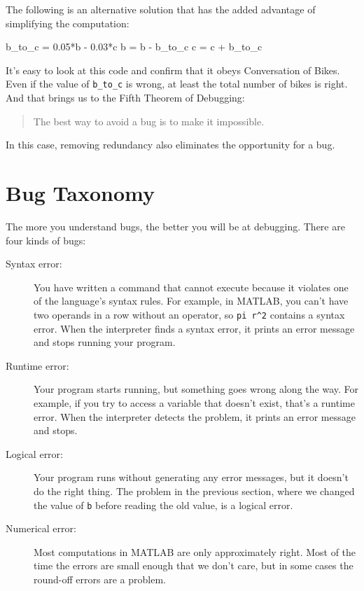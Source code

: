 
The following is an alternative solution that
has the added advantage of simplifying the computation:

\begin{code}
b_to_c = 0.05*b - 0.03*c
b = b - b_to_c
c = c + b_to_c
\end{code}

It's easy to look at this code and confirm that it obeys Conversation
of Bikes.  Even if the value of \verb"b_to_c" is wrong, at least the total
number of bikes is right.  And that brings us to the Fifth Theorem of
Debugging:

\begin{quote}
The best way to avoid a bug is to make it impossible.
\end{quote}


In this case, removing redundancy also eliminates the opportunity for a bug.

\section{Bug Taxonomy}

The more you understand bugs, the better you will be at debugging.
There are four kinds of bugs:


\begin{description}

\item[Syntax error:] You have written a command that cannot
execute because it violates one of the language's syntax rules.  For example, in MATLAB,
you can't have two operands in a row without an operator, so
\verb+pi r^2+ contains a syntax error.  When the interpreter finds a syntax
error, it prints an error message and stops running your program.

\item[Runtime error:] Your program starts running, but something goes
wrong along the way.  For example, if you try to access a variable
that doesn't exist, that's a runtime error.  When the interpreter detects the
problem, it prints an error message and stops.

\item[Logical error:] Your program runs without generating any error
messages, but it doesn't do the right thing.  The problem in the
previous section, where we changed the value of {\tt b} before
reading the old value, is a logical error.

\item[Numerical error:] Most computations in MATLAB are only
approximately right.  Most of the time the errors are small enough
that we don't care, but in some cases the round-off errors are a problem.

\end{description}

